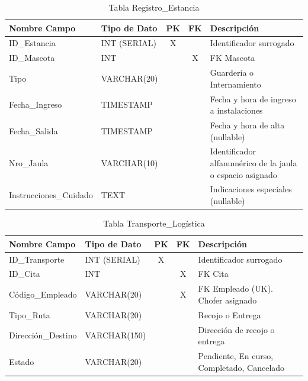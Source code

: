 \begin{table}[H]
\centering
\footnotesize
\begin{tabular}{|l|l|c|c|p{5cm}|}
\hline
\textbf{Nombre Campo} & \textbf{Tipo de Dato} & \textbf{PK} & \textbf{FK} & \textbf{Descripción} \\
\hline
ID\_Estancia & INT (SERIAL) & X & & Identificador surrogado \\
\hline
ID\_Mascota & INT & & X & FK Mascota \\
\hline
Tipo & VARCHAR(20) & & & Guardería o Internamiento \\
\hline
Fecha\_Ingreso & TIMESTAMP & & & Fecha y hora de ingreso a instalaciones \\
\hline
Fecha\_Salida & TIMESTAMP & & & Fecha y hora de alta (nullable) \\
\hline
Nro\_Jaula & VARCHAR(10) & & & Identificador alfanumérico de la jaula o espacio asignado \\
\hline
Instrucciones\_Cuidado & TEXT & & & Indicaciones especiales (nullable) \\
\hline
\end{tabular}
\caption{Tabla Registro\_Estancia}
\end{table}

\begin{table}[H]
\centering
\footnotesize
\begin{tabular}{|l|l|c|c|p{5cm}|}
\hline
\textbf{Nombre Campo} & \textbf{Tipo de Dato} & \textbf{PK} & \textbf{FK} & \textbf{Descripción} \\
\hline
ID\_Transporte & INT (SERIAL) & X & & Identificador surrogado \\
\hline
ID\_Cita & INT & & X & FK Cita \\
\hline
Código\_Empleado & VARCHAR(20) & & X & FK Empleado (UK). Chofer asignado \\
\hline
Tipo\_Ruta & VARCHAR(20) & & & Recojo o Entrega \\
\hline
Dirección\_Destino & VARCHAR(150) & & & Dirección de recojo o entrega \\
\hline
Estado & VARCHAR(20) & & & Pendiente, En curso, Completado, Cancelado \\
\hline
\end{tabular}
\caption{Tabla Transporte\_Logística}
\end{table}

